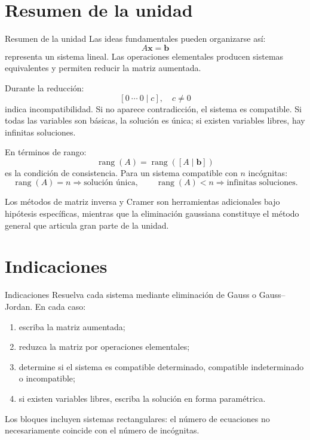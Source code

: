 \documentclass[aspectratio=169,9pt]{beamer}
\theoremstyle{remark}
\newcommand{\rank}{\operatorname{rang}}
\begin{document}
\section{Resumen de la unidad}
\begin{frame}[allowframebreaks,t]{Resumen de la unidad}
Las ideas fundamentales pueden organizarse así:
\[
A\mathbf x=\mathbf b
\]
representa un sistema lineal. Las operaciones elementales producen sistemas equivalentes y permiten
reducir la matriz aumentada.

Durante la reducción:
\[
[0\ \cdots\ 0\mid c],\quad c\neq0
\]
indica incompatibilidad. Si no aparece contradicción, el sistema es compatible. Si todas las variables
son básicas, la solución es única; si existen variables libres, hay infinitas soluciones.

En términos de rango:
\[
\boxed{\rank(A)=\rank([A\mid\mathbf b])}
\]
es la condición de consistencia. Para un sistema compatible con $n$ incógnitas:
\[
\rank(A)=n\Longrightarrow\text{solución única},
\qquad
\rank(A)<n\Longrightarrow\text{infinitas soluciones}.
\]

Los métodos de matriz inversa y Cramer son herramientas adicionales bajo hipótesis específicas, mientras
que la eliminación gaussiana constituye el método general que articula gran parte de la unidad.
\end{frame}

\begin{frame}\titlepage\end{frame}
\section{Indicaciones}
\begin{frame}{Indicaciones}
\small
Resuelva cada sistema mediante eliminación de Gauss o Gauss--Jordan. En cada caso:
\begin{enumerate}
\item escriba la matriz aumentada;
\item reduzca la matriz por operaciones elementales;
\item determine si el sistema es compatible determinado, compatible indeterminado o incompatible;
\item si existen variables libres, escriba la solución en forma paramétrica.
\end{enumerate}
\medskip
Los bloques incluyen sistemas rectangulares: el número de ecuaciones no necesariamente coincide con el número de incógnitas.
\end{frame}
\end{document}
